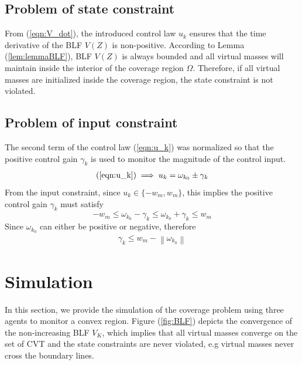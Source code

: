 \documentclass[journal]{IEEEtran}
\newcommand{\norm}[1]{\left\lVert#1\right\rVert}
\newcommand{\twopartdef}[4]
{
	\left\{
	\begin{array}{ll}
		#1 & #2 \\
		#3 & #4
	\end{array}
	\right.
}
\begin{document}
	\subsection{Problem of state constraint}
	From (\ref{eqn:V_dot}), the introduced control law $u_k$ ensures that the time derivative of the BLF $V(Z)$ is non-positive. According to Lemma (\ref{lem:lemmaBLF}), BLF $V(Z)$ is always bounded and all virtual masses will maintain inside the interior of the coverage region $\Omega$. Therefore, if all virtual masses are initialized inside the coverage region, the state constraint is not violated.
	
	\subsection{Problem of input constraint}
	The second term of the control law (\ref{eqn:u_k}) was normalized so that the positive control gain $\gamma_k$ is used to monitor the magnitude of the control input.   
	\begin{equation} \notag
	\begin{split}
	(\ref{eqn:u_k}) & \implies u_k = \omega_{k_0} \pm \gamma_k \\
	\end{split}
	\end{equation}
	From the input constraint, since $ u_k \in \{-w_m, w_m\} $, this implies the positive control gain $\gamma_k$ must satisfy 
	\[ -w_m \leq \omega_{k_0} - \gamma_k \leq \omega_{k_0} + \gamma_k \leq w_m \]
	Since $\omega_{k_0}$ can either be positive or negative, therefore
	\begin{equation} \label{eqn:gammaCond}
	\begin{split}
	\gamma_k \leq w_m - \norm{\omega_{k_0}}
	\end{split}
	\end{equation}
	
	\section{Simulation} \label{section:sim}
	In this section, we provide the simulation of the coverage problem using three agents to monitor a convex region. Figure (\ref{fig:BLF}) depicts the convergence of the non-increasing BLF $V_K$, which implies that all virtual masses converge on the set of CVT and the state constraints are never violated, e.g virtual masses never cross the boundary lines.
	
\end{document}
